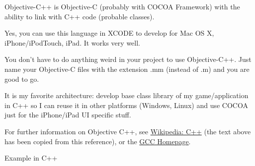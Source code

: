 Objective-C++ is Objective-C (probably with COCOA Framework) with the ability to link with C++ code (probable classes).

\vpara
Yes, you can use this language in XCODE to develop for Mac OS X, iPhone/iPodTouch, iPad. It works very well.

You don't have to do anything weird in your project to use Objective-C++. Just name your Objective-C files with the extension .mm (instead of .m) and you are good to go.

\vpara
It is my favorite architecture: develop base class library of my game/application in C++ so I can reuse it in other platforms (Windows, Linux) and use COCOA just for the iPhone/iPad UI specific stuff.



\vpara
For further information on Objective C++, see \href{http://en.wikipedia.org/wiki/C\%2B\%2B}{Wikipedia: C++} (the text above has been copied from this reference), or the  \href{http://gcc.gnu.org/}{GCC Homepage}.


\vpara
Example in C++


